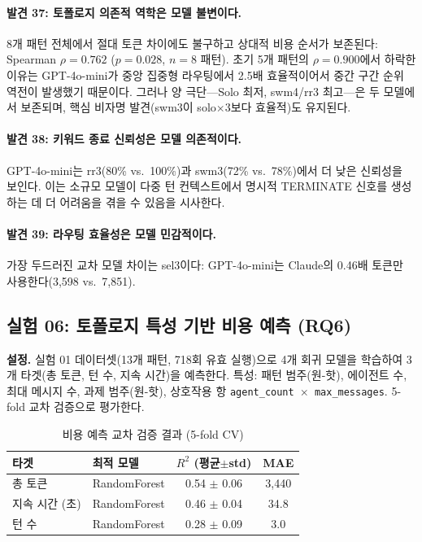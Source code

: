 \documentclass[a4paper,11pt]{article}
\begin{document}
\paragraph{발견 37: 토폴로지 의존적 역학은 모델 불변이다.}
8개 패턴 전체에서 절대 토큰 차이에도 불구하고 상대적 비용 순서가 보존된다: Spearman $\rho = 0.762$ ($p = 0.028$, $n = 8$ 패턴). 초기 5개 패턴의 $\rho = 0.900$에서 하락한 이유는 GPT-4o-mini가 중앙 집중형 라우팅에서 2.5배 효율적이어서 중간 구간 순위 역전이 발생했기 때문이다. 그러나 양 극단---Solo 최저, swm4/rr3 최고---은 두 모델에서 보존되며, 핵심 비자명 발견(swm3이 solo$\times$3보다 효율적)도 유지된다.

\paragraph{발견 38: 키워드 종료 신뢰성은 모델 의존적이다.}
GPT-4o-mini는 rr3(80\% vs.\ 100\%)과 swm3(72\% vs.\ 78\%)에서 더 낮은 신뢰성을 보인다. 이는 소규모 모델이 다중 턴 컨텍스트에서 명시적 TERMINATE 신호를 생성하는 데 더 어려움을 겪을 수 있음을 시사한다.

\paragraph{발견 39: 라우팅 효율성은 모델 민감적이다.}
가장 두드러진 교차 모델 차이는 sel3이다: GPT-4o-mini는 Claude의 0.46배 토큰만 사용한다(3,598 vs.\ 7,851).

\subsection{실험 06: 토폴로지 특성 기반 비용 예측 (RQ6)}
\label{sec:exp06}

\textbf{설정.} 실험 01 데이터셋(13개 패턴, 718회 유효 실행)으로 4개 회귀 모델을 학습하여 3개 타겟(총 토큰, 턴 수, 지속 시간)을 예측한다. 특성: 패턴 범주(원-핫), 에이전트 수, 최대 메시지 수, 과제 범주(원-핫), 상호작용 항 \texttt{agent\_count $\times$ max\_messages}. 5-fold 교차 검증으로 평가한다.

\begin{table}[H]
\centering
\caption{비용 예측 교차 검증 결과 (5-fold CV)}
\label{tab:cost-prediction-cv}
{\small
\begin{tabular}{llcc}
\toprule
타겟 & 최적 모델 & $R^{2}$ (평균$\pm$std) & MAE \\
\midrule
총 토큰     & RandomForest & 0.54 $\pm$ 0.06 & 3,440 \\
지속 시간 (초) & RandomForest & 0.46 $\pm$ 0.04 & 34.8 \\
턴 수       & RandomForest & 0.28 $\pm$ 0.09 & 3.0 \\
\bottomrule
\end{tabular}
}
\end{table}
\end{document}
